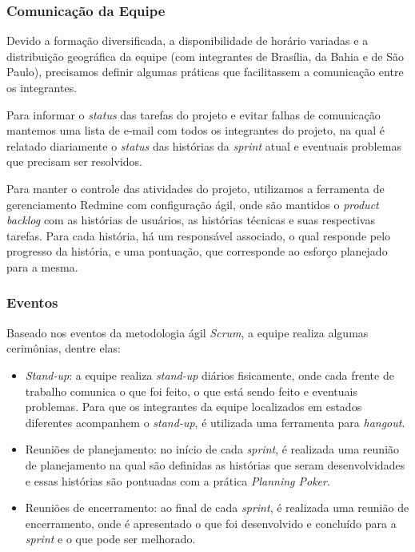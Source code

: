 \subsubsection{Comunicação da Equipe}

Devido a formação diversificada, a disponibilidade de horário variadas e a distribuição geográfica da equipe (com integrantes de Brasília, da Bahia e de São Paulo), precisamos definir algumas práticas que facilitassem a comunicação entre os integrantes. 

Para informar o \textit{status} das tarefas do projeto e evitar falhas de comunicação mantemos uma lista de e-mail com todos os integrantes do projeto, na qual é relatado diariamente o \textit{status} das histórias da \textit{sprint} atual e eventuais problemas que precisam ser resolvidos. 

Para manter o controle das atividades do projeto, utilizamos a ferramenta de gerenciamento Redmine com configuração ágil, onde são mantidos o \textit{product backlog} com as histórias de usuários, as histórias técnicas e suas respectivas tarefas. Para cada história, há um responsável associado, o qual responde pelo progresso da história, e uma pontuação, que corresponde ao esforço planejado para a mesma.



\subsubsection{Eventos}

Baseado nos eventos da metodologia ágil \textit{Scrum}, a equipe realiza algumas cerimônias, dentre elas:

\begin{itemize}
 \item \textit{Stand-up}: a equipe realiza \textit{stand-up} diários fisicamente, onde cada frente de trabalho comunica o que foi feito, o que está sendo feito e eventuais problemas. Para que os integrantes da equipe localizados em estados diferentes acompanhem o \textit{stand-up}, é utilizada uma ferramenta para \textit{hangout}.
 \item Reuniões de planejamento: no início de cada \textit{sprint}, é realizada uma reunião de planejamento na qual são definidas as histórias que seram desenvolvidades e essas histórias são pontuadas com a prática \textit{Planning Poker}.
 \item Reuniões de encerramento: ao final de cada \textit{sprint}, é realizada uma reunião de encerramento, onde é apresentado o que foi desenvolvido e concluído para a \textit{sprint} e o que pode ser melhorado.
\end{itemize}


